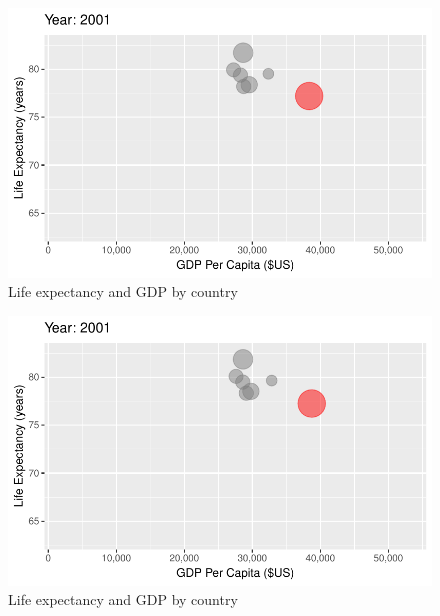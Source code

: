 \documentclass[
  letterpaper,
  DIV=11,
  numbers=noendperiod]{scrreport}
\theoremstyle{definition}
\theoremstyle{remark}
\begin{document}
\begin{figure}

{\centering \includegraphics{index_files/figure-pdf/fig-anim-country-89.pdf}

}

\caption{\label{fig-anim-country-89}Life expectancy and GDP by country}

\end{figure}

\begin{figure}

{\centering \includegraphics{index_files/figure-pdf/fig-anim-country-90.pdf}

}

\caption{\label{fig-anim-country-90}Life expectancy and GDP by country}

\end{figure}
\end{document}
